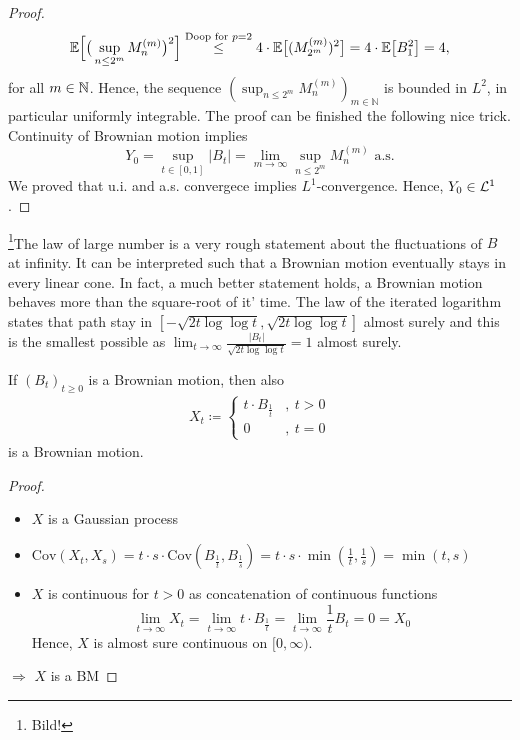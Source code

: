 \begin{proof}[Proof]
	\begin{align*}
		\mathbb{E}\Big[ \big(\sup_{n\leq 2^m} M_n^{(m)}\big)^2\Big] \overset{\text{Doop for }p=2}{\leq} 4 \cdot \mathbb{E}\big[ (M_{2^m}^{(m)})^2\big] = 4 \cdot \mathbb{E} \big[ B_1^2\big] = 4,
	\end{align*}
	for all $m\in \mathbb{N}$. Hence, the sequence $(\sup_{n\leq 2^m} M_n^{(m)})_{m\in\mathbb{N}}$ is bounded in $L^2$, in particular uniformly integrable. The proof can be finished the following nice trick. Continuity of Brownian motion implies $$Y_0 = \sup_{t\in[0,1]}\lvert B_t \rvert  = \lim_{m\to\infty} \sup_{n\leq 2^m} M_n^{(m)} \text{  a.s.}$$
	We proved that u.i. and a.s. convergece implies $L^1$-convergence. Hence, $Y_0\in \mathcal{L}^1$.
\end{proof}
\footnote{Bild!}The law of large number is a very rough statement about the fluctuations of $B$ at infinity. It can be interpreted such that a Brownian motion eventually stays in every linear cone. In fact, a much better statement holds, a Brownian motion behaves more than the square-root of it' time. The law of the iterated logarithm states that path stay in 
 $[-\sqrt{2t \log \log t},\sqrt{2t \log \log t}]$ almost surely and this is the smallest possible as $\lim_{t\to\infty}\frac{|B_t|}{\sqrt{2t \log \log t}}=1$ almost surely.
\begin{llemma}
\begin{prop}
	If $(B_t)_{t\geq 0}$ is a Brownian motion, then also 
	\begin{align*}
		X_t\coloneqq \begin{cases}
					t\cdot B_{\frac{1}{t}} &, \: t> 0 \\
					0 &, \: t=0
					\end{cases}
	\end{align*}
	is a Brownian motion.
\end{prop}
\end{llemma}
\begin{proof}[Proof]
	\begin{itemize}
		\item $X$ is a Gaussian process
		\item $\text{Cov}(X_t,X_s) = t\cdot s \cdot \text{Cov}(B_{\frac{1}{t}},B_{\frac{1}{s}}) = t\cdot s \cdot \min(\frac{1}{t},\frac{1}{s}) = \min(t,s)$
		\item $X$ is continuous for $t>0$ as concatenation of continuous functions $$\lim_{t\to\infty} X_t = \lim_{t\to\infty} t\cdot B_{\frac{1}{t}} = \lim_{t\to\infty} \frac{1}{t} B_t = 0 = X_0$$
		Hence, $X$ is almost sure continuous on $[0,\infty)$.
	\end{itemize}
	$\Rightarrow$ $X$ is a BM
\end{proof}
